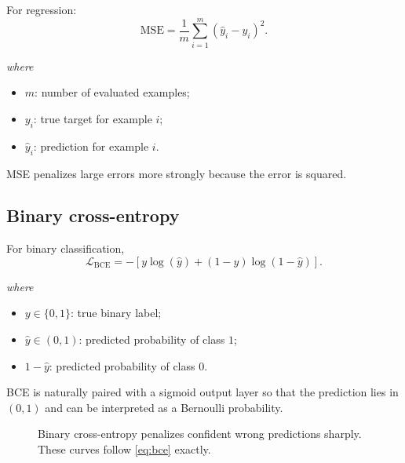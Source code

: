 \documentclass[11pt,a4paper]{report}
\newcommand{\wherelegend}{\par\smallskip\textit{where}\vspace{-0.3em}}
\begin{document}
For regression:
\begin{equation}
  \mathrm{MSE}=\frac{1}{m}\sum_{i=1}^{m}(\hat y_i-y_i)^2.
  \label{eq:dnn-mse}
\end{equation}
\wherelegend
\begin{itemize}
  \item $m$: number of evaluated examples;
  \item $y_i$: true target for example $i$;
  \item $\hat y_i$: prediction for example $i$.
\end{itemize}
MSE penalizes large errors more strongly because the error is squared.

\subsection{Binary cross-entropy}

For binary classification,
\begin{equation}
  \mathcal{L}_{\mathrm{BCE}}
  =-\left[y\log(\hat y)+(1-y)\log(1-\hat y)\right].
  \label{eq:bce}
\end{equation}
\wherelegend
\begin{itemize}
  \item $y\in\{0,1\}$: true binary label;
  \item $\hat y\in(0,1)$: predicted probability of class $1$;
  \item $1-\hat y$: predicted probability of class $0$.
\end{itemize}
BCE is naturally paired with a sigmoid output layer so that the prediction lies in $(0,1)$ and can be interpreted as a Bernoulli probability.

\begin{figure}[H]
\centering
{}
\caption{Binary cross-entropy penalizes confident wrong predictions sharply. These curves follow \cref{eq:bce} exactly.}
\label{fig:bce-curves}
\end{figure}
\end{document}
